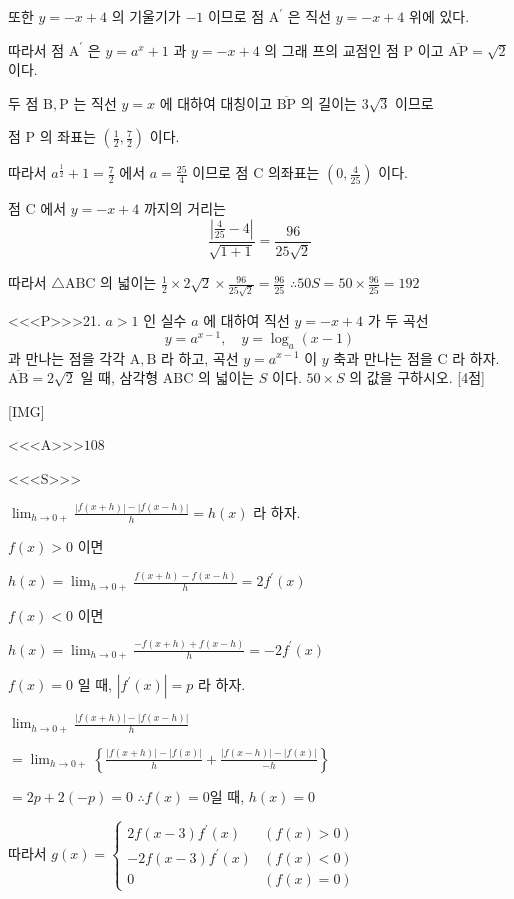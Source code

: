 \documentclass{oblivoir}
\begin{document}
또한 $y=-x+4$ 의 기울기가 $-1$ 이므로 점 $\mathrm{A}^{\prime}$ 은 직선 $y=-x+4$ 위에 있다.

따라서 점 $\mathrm{A}^{\prime}$ 은 $y=a^{x}+1$ 과 $y=-x+4$ 의 그래 프의 교점인 점 $\mathrm{P}$ 이고 $\overline{\mathrm{AP}}=\sqrt{2}$ 이다.

두 점 $\mathrm{B}, \mathrm{P}$ 는 직선 $y=x$ 에 대하여 대칭이고 $\overline{\mathrm{BP}}$ 의 길이는 $3 \sqrt{3}$ 이므로

점 $\mathrm{P}$ 의 좌표는 $\left(\frac{1}{2}, \frac{7}{2}\right)$ 이다.

따라서 $a^{\frac{1}{2}}+1=\frac{7}{2}$ 에서 $a=\frac{25}{4}$ 이므로 점 $\mathrm{C}$ 의좌표는 $\left(0, \frac{4}{25}\right)$ 이다.

점 $\mathrm{C}$ 에서 $y=-x+4$ 까지의 거리는
$$
\frac{\left|\frac{4}{25}-4\right|}{\sqrt{1+1}}=\frac{96}{25 \sqrt{2}}
$$

따라서 $\triangle \mathrm{ABC}$ 의 넓이는 $\frac{1}{2} \times 2 \sqrt{2} \times \frac{96}{25 \sqrt{2}}=\frac{96}{25}$ $\therefore 50 S=50 \times \frac{96}{25}=192$


<<<P>>>21. $a>1$ 인 실수 $a$ 에 대하여 직선 $y=-x+4$ 가 두 곡선
$$
y=a^{x-1}, \quad y=\log _{a}(x-1)
$$
과 만나는 점을 각각 $\mathrm{A}, \mathrm{B}$ 라 하고, 곡선 $y=a^{x-1}$ 이 $y$ 축과 만나는 점을 $\mathrm{C}$ 라 하자. $\overline{\mathrm{AB}}=2 \sqrt{2}$ 일 때, 삼각형 $\mathrm{ABC}$ 의 넓이는 $S$ 이다. $50 \times S$ 의 값을 구하시오. [4점]

[IMG]

<<<A>>>$108$

<<<S>>>



$ \lim _{h \rightarrow 0+} \frac{|f(x+h)|-|f(x-h)|}{h}=h(x)$ 라 하자.

$f(x)>0$ 이면

$h(x)=\lim _{h \rightarrow 0+} \frac{f(x+h)-f(x-h)}{h}=2 f^{\prime}(x)$

$f(x)<0 $ 이면

$h(x)=\lim _{h \rightarrow 0+} \frac{-f(x+h)+f(x-h)}{h}=-2 f^{\prime}(x)$

$f(x)=0 $ 일 때, $\left|f^{\prime}(x)\right|=p $ 라 하자.

$\lim _{h \rightarrow 0+} \frac{|f(x+h)|-|f(x-h)|}{h}$

$=\lim _{h \rightarrow 0+}\left\{\frac{|f(x+h)|-|f(x)|}{h} + \frac{|f(x-h)|-|f(x)|}{-h}\right\}$

$=2 p+2(-p)=0$
$\therefore f(x)=0$일 때, $h(x)=0$


따라서 $g(x)=\begin{cases}
2 f(x-3) f^{\prime}(x) & (f(x)>0) \\
-2 f(x-3) f^{\prime}(x) & (f(x)<0) \\
0 & (f(x)=0)
\end{cases}$
\end{document}
